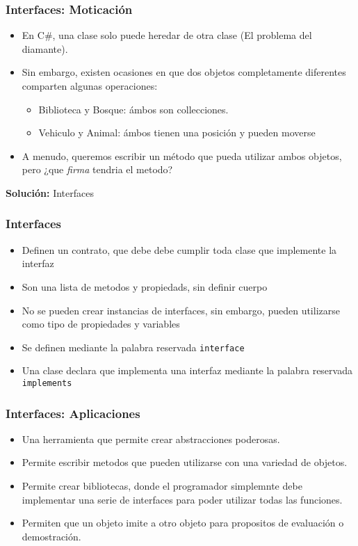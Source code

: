 \documentclass{beamer}
\begin{document}
\begin{frame}
    \frametitle{Interfaces: Moticaci\'on}
    \begin{itemize}
        \item{En C\#, una clase solo puede heredar de otra clase (El problema del diamante).}
        \item{Sin embargo, existen ocasiones en que dos objetos completamente
            diferentes comparten algunas operaciones:
                \begin{itemize}
                    \item{Biblioteca y Bosque: \'ambos son collecciones.}
                    \item{Vehiculo y Animal: \'ambos tienen una posici\'on y pueden moverse}
                \end{itemize}
            }
        \item{A menudo, queremos escribir un m\'etodo que pueda utilizar ambos
            objetos, pero ¿que \emph{firma} tendria el metodo?}
    \end{itemize}
{\bf Soluci\'on: } Interfaces
\end{frame}

\begin{frame}
    \frametitle{Interfaces}
    \begin{itemize}
        \item{Definen un contrato, que debe debe cumplir toda clase
            que implemente la interfaz}
        \item{Son una lista de metodos y propiedads, sin definir cuerpo}
        \item{No se pueden crear instancias de interfaces, sin embargo,
            pueden utilizarse como tipo de propiedades y variables}
        \item{Se definen mediante la palabra reservada \texttt{interface}}
        \item{Una clase declara que implementa una interfaz mediante la
            palabra reservada \texttt{implements}}
    \end{itemize}
\end{frame}

\begin{frame}
    \frametitle{Interfaces: Aplicaciones}
    \begin{itemize}
        \item{Una herramienta que permite crear abstracciones poderosas.}
        \item{Permite escribir metodos que pueden utilizarse con una variedad de objetos.}
        \item{Permite crear bibliotecas, donde el programador simplemnte debe implementar
            una serie de interfaces para poder utilizar todas las funciones.}
        \item{Permiten que un objeto imite a otro objeto para propositos de
            evaluaci\'on o demostraci\'on.}
    \end{itemize}
\end{frame}
\end{document}
